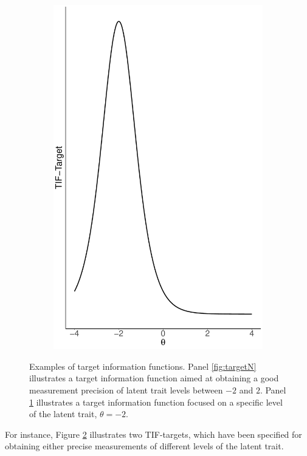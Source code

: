 \documentclass[12pt, a4paper, titilepage]{article}
\begin{document}
\begin{figure}
\begin{subfigure}{0.45\linewidth}
		\includegraphics[width=\textwidth]{img/target_sk}
		\caption{}
		\label{fig:targetSK}
	\end{subfigure}
\caption{Examples of target information functions. Panel \ref{fig:targetN} illustrates a target information function aimed at obtaining a good measurement precision of latent trait levels between $-2$ and $2$. Panel \ref{fig:targetSK} illustrates a target information function focused on a specific level of the latent trait, $\theta = -2$.}
	\label{fig:tartge-examples}
\end{figure}
For instance, Figure \ref{fig:tartge-examples} illustrates two TIF-targets, which have been specified for obtaining either  precise measurements of different levels of the latent trait. 
\end{document}
